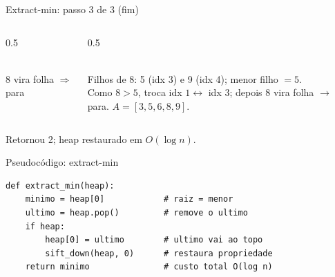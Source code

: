 \documentclass[aspectratio=169]{beamer}
\begin{document}
\begin{frame}{Extract-min: passo 3 de 3 (fim)}
  \begin{columns}[T]
    \begin{column}{0.5\textwidth}
    \centering
    \\[0.4em]
    {\footnotesize 8 vira folha $\Rightarrow$ para}
    \end{column}
    \begin{column}{0.5\textwidth}
    \centering
    \\[0.6em]
    {\footnotesize Filhos de 8: 5 (idx 3) e 9 (idx 4); menor
    filho $=5$.}\\[0.3em]
    {\footnotesize Como $8>5$, troca idx $1 \leftrightarrow$ idx $3$;
    depois 8 vira folha $\to$ para. $A=[3,5,6,8,9]$.}
    \end{column}
  \end{columns}
  \begin{center}
    {\footnotesize\color{UFSBlue}Retornou 2; heap restaurado em $O(\log n)$.}
  \end{center}
\end{frame}

\begin{frame}[fragile]{Pseudocódigo: extract-min}
\begin{lstlisting}
def extract_min(heap):
    minimo = heap[0]            # raiz = menor
    ultimo = heap.pop()         # remove o ultimo
    if heap:
        heap[0] = ultimo        # ultimo vai ao topo
        sift_down(heap, 0)      # restaura propriedade
    return minimo               # custo total O(log n)
\end{lstlisting}
\end{frame}
\end{document}
